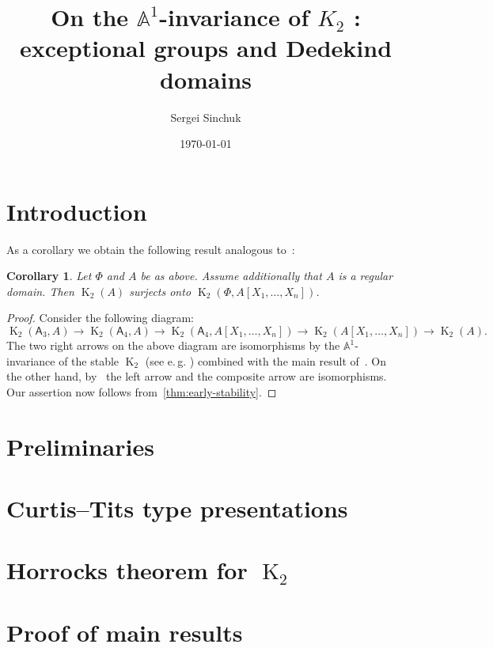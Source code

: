 \documentclass[oneside, 10pt]{amsart}
\title{On the $\mathbb{A}^1$-invariance of $K_2$ \RNum{2}: exceptional groups and Dedekind domains}
\author {Sergei Sinchuk}
\date {\today}
\DeclareMathOperator{\K}{K}
\newcommand{\rA}{\mathsf{A}}
\numberwithin{equation}{section}
\numberwithin{thm}{section}
\numberwithin{lemma}{section}
\newtheorem{cor}[lemma]{Corollary}
\theoremstyle{definition}
\theoremstyle{remark}
\begin{document}
    \maketitle

    \section{Introduction}\label{sec:introduction}

    As a corollary we obtain the following result analogous to~\cite[Theorem~1.1]{St-Ded}:
    \begin{cor}
        \label{cor:dedekind}
        Let $\Phi$ and $A$ be as above.
        Assume additionally that $A$ is a regular domain.
        Then $\K_2(A)$ surjects onto $\K_2(\Phi, A[X_1,\ldots, X_n])$.
    \end{cor}
    \begin{proof}
        Consider the following diagram:
        \[ \K_2(\rA_3, A) \to \K_2(\rA_4, A) \to \K_2(\rA_4, A[X_1, \ldots, X_n]) \rightarrow \K_2(A[X_1, \ldots, X_n]) \to \K_2(A).\]
        The two right arrows on the above diagram are isomorphisms by the $\mathbb{A}^1$-invariance of the stable $\K_2$
        (see e.\,g. \cite[Theorem~V.6.3]{Kbook}) combined with the main result of~\cite{Tu83}.
        On the other hand, by~\cite[Corollary~3.2]{ST76} the left arrow and the composite arrow are isomorphisms.
        Our assertion now follows from~\cref{thm:early-stability}.
    \end{proof}


    \section{Preliminaries}\label{sec:preliminaries}
    

    \section{Curtis--Tits type presentations} \label{sec:affine}
    

    \section{Horrocks theorem for $\K_2$} \label{sec:horrocks}
    

    \section{Proof of main results} \label{sec:main}
    

    \printbibliography
\end{document}
